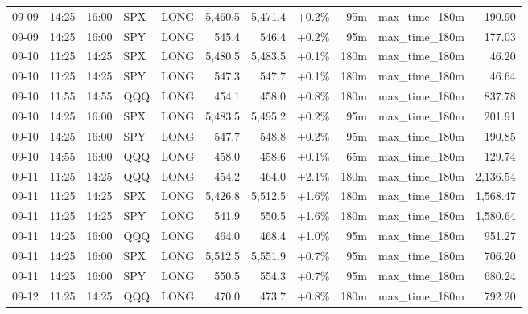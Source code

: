 \documentclass[11pt,a4paper,twoside]{article}
\begin{document}
\begin{center}
\begin{longtable}{>{\color{txtmain}}l l l l l r r r r >{\color{txtmain}}l r}
09-09 & 14:25 & 16:00 & SPX & LONG & 5,460.5 & 5,471.4 & \textcolor{wingreen}{+0.2\%} & 95m & max\_time\_180m & \textcolor{wingreen}{190.90} \\
09-09 & 14:25 & 16:00 & SPY & LONG & 545.4 & 546.4 & \textcolor{wingreen}{+0.2\%} & 95m & max\_time\_180m & \textcolor{wingreen}{177.03} \\
09-10 & 11:25 & 14:25 & SPX & LONG & 5,480.5 & 5,483.5 & \textcolor{wingreen}{+0.1\%} & 180m & max\_time\_180m & \textcolor{wingreen}{46.20} \\
09-10 & 11:25 & 14:25 & SPY & LONG & 547.3 & 547.7 & \textcolor{wingreen}{+0.1\%} & 180m & max\_time\_180m & \textcolor{wingreen}{46.64} \\
09-10 & 11:55 & 14:55 & QQQ & LONG & 454.1 & 458.0 & \textcolor{wingreen}{+0.8\%} & 180m & max\_time\_180m & \textcolor{wingreen}{837.78} \\
09-10 & 14:25 & 16:00 & SPX & LONG & 5,483.5 & 5,495.2 & \textcolor{wingreen}{+0.2\%} & 95m & max\_time\_180m & \textcolor{wingreen}{201.91} \\
09-10 & 14:25 & 16:00 & SPY & LONG & 547.7 & 548.8 & \textcolor{wingreen}{+0.2\%} & 95m & max\_time\_180m & \textcolor{wingreen}{190.85} \\
09-10 & 14:55 & 16:00 & QQQ & LONG & 458.0 & 458.6 & \textcolor{wingreen}{+0.1\%} & 65m & max\_time\_180m & \textcolor{wingreen}{129.74} \\
09-11 & 11:25 & 14:25 & QQQ & LONG & 454.2 & 464.0 & \textcolor{wingreen}{+2.1\%} & 180m & max\_time\_180m & \textcolor{wingreen}{2,136.54} \\
09-11 & 11:25 & 14:25 & SPX & LONG & 5,426.8 & 5,512.5 & \textcolor{wingreen}{+1.6\%} & 180m & max\_time\_180m & \textcolor{wingreen}{1,568.47} \\
09-11 & 11:25 & 14:25 & SPY & LONG & 541.9 & 550.5 & \textcolor{wingreen}{+1.6\%} & 180m & max\_time\_180m & \textcolor{wingreen}{1,580.64} \\
09-11 & 14:25 & 16:00 & QQQ & LONG & 464.0 & 468.4 & \textcolor{wingreen}{+1.0\%} & 95m & max\_time\_180m & \textcolor{wingreen}{951.27} \\
09-11 & 14:25 & 16:00 & SPX & LONG & 5,512.5 & 5,551.9 & \textcolor{wingreen}{+0.7\%} & 95m & max\_time\_180m & \textcolor{wingreen}{706.20} \\
09-11 & 14:25 & 16:00 & SPY & LONG & 550.5 & 554.3 & \textcolor{wingreen}{+0.7\%} & 95m & max\_time\_180m & \textcolor{wingreen}{680.24} \\
09-12 & 11:25 & 14:25 & QQQ & LONG & 470.0 & 473.7 & \textcolor{wingreen}{+0.8\%} & 180m & max\_time\_180m & \textcolor{wingreen}{792.20} \\

\end{longtable}
\end{center}
\end{document}
